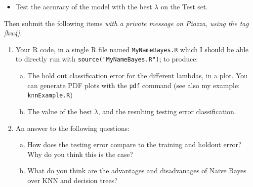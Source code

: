 \begin{exercise}
\begin{enumerate}
\begin{itemize}
    \item Test the accuracy of the model with the best $\lambda$ on the Test set.
    \end{itemize}
  \end{enumerate}
  Then submit the following items \emph{with a private message on Piazza, using the tag [hw4]}.
  \begin{enumerate}
  \item Your R code, in a single R file named \texttt{MyNameBayes.R} which I should be able to directly run with \texttt{source("MyNameBayes.R")}; to produce:
    \begin{enumerate}[(a)]
    \item The hold out classification error for the different
      lambdas, in a plot. You can generate PDF plots with the \texttt{pdf} command (see also my example: \texttt{knnExample.R})
    \item The value of the best $\lambda$, and the
      resulting testing error classification.
    \end{enumerate}
  \item An answer to the following questions:
    \begin{enumerate}[(a)]
    \item How does the testing error compare to the training and holdout
      error? Why do you think this is the case?
    \item What do you think are the advantages and disadvanages of Naive
      Bayes over KNN and decision trees?
    \end{enumerate}
  \end{enumerate}
\end{exercise}

